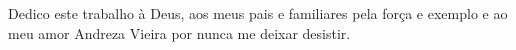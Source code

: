 Dedico este trabalho à Deus, aos meus pais e familiares pela força e exemplo e
ao meu amor Andreza Vieira por nunca me deixar desistir.
